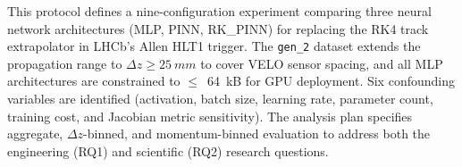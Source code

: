 \documentclass[a4paper,11pt]{article}
\newcommand{\SI}[2]{#1~#2}
\newcommand{\kilo}{k}
\newcommand{\byte}{B}
\newcommand{\mm}{mm}
\newcommand{\dz}{\Delta z}
\begin{document}
This protocol defines a nine-configuration experiment comparing three
neural network architectures (MLP, PINN, RK\_PINN) for replacing the RK4
track extrapolator in LHCb's Allen HLT1 trigger.  The \texttt{gen\_2}
dataset extends the propagation range to $\dz \geq \SI{25}{\mm}$ to cover
VELO sensor spacing, and all MLP architectures are constrained to
$\leq$~\SI{64}{\kilo\byte} for GPU deployment.  Six confounding variables
are identified (activation, batch size, learning rate, parameter count,
training cost, and Jacobian metric sensitivity).  The analysis plan
specifies aggregate, $\dz$-binned, and momentum-binned evaluation to
address both the engineering (RQ1) and scientific (RQ2) research
questions.

\end{document}
